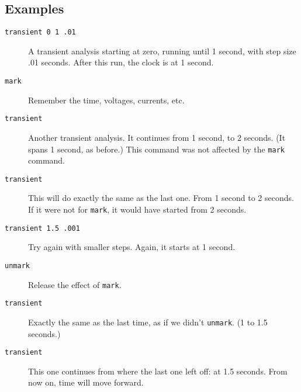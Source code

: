 \subsection{Examples}

\begin{description}
\item[{\tt transient 0 1 .01}] A transient analysis starting at zero,
running until 1 second, with step size .01 seconds.  After this run, the
clock is at 1 second.

\item[{\tt mark}] Remember the time, voltages, currents, etc.

\item[{\tt transient}] Another transient analysis.  It continues from 1
second, to 2 seconds.  (It spans 1 second, as before.)  This command was not
affected by the {\tt mark} command.

\item[{\tt transient}] This will do exactly the same as the last one.  From
1 second to 2 seconds.  If it were not for {\tt mark}, it would have started
from 2 seconds.

\item[{\tt transient 1.5 .001}] Try again with smaller steps.  Again, it
starts at 1 second.

\item[{\tt unmark}] Release the effect of {\tt mark}.

\item[{\tt transient}] Exactly the same as the last time, as if we didn't
{\tt unmark}.  (1 to 1.5 seconds.)

\item[{\tt transient}] This one continues from where the last one left off:
at 1.5 seconds.  From now on, time will move forward.

\end{description}
